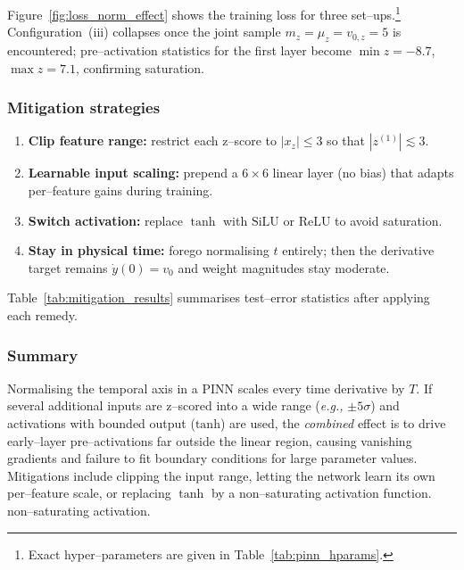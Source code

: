 Figure~\ref{fig:loss_norm_effect} shows the training loss for three
set--ups.\footnote{%
Exact hyper–parameters are given in Table~\ref{tab:pinn_hparams}.}
Configuration~(iii) collapses once the joint sample
$m_z\!=\!\mu_z\!=\!v_{0,z}\!=\!5$ is encountered; pre--activation statistics
for the first layer become
$\min z=-8.7$, $\max z=7.1$,
confirming saturation.

\subsubsection{Mitigation strategies}

\begin{enumerate}[label=(\roman*)]
  \item \textbf{Clip feature range:} restrict each z--score to
        $\lvert x_z\rvert\le 3$ so that $|z^{(1)}|\lesssim3$.
  \item \textbf{Learnable input scaling:} prepend a $6\times6$
        linear layer (no bias) that adapts per--feature gains during
        training.
  \item \textbf{Switch activation:} replace $\tanh$ with
        $\mathrm{SiLU}$ or $\mathrm{ReLU}$ to avoid saturation.
  \item \textbf{Stay in physical time:} forego normalising $t$
        entirely; then the derivative target remains $\dot y(0)=v_0$
        and weight magnitudes stay moderate.
\end{enumerate}

Table~\ref{tab:mitigation_results} summarises test--error statistics after
applying each remedy.

\subsubsection{Summary}

Normalising the temporal axis in a PINN scales every time derivative by $T$.
If several additional inputs are z–scored into a wide range (\textit{e.g.,} $\pm5\sigma$)
and activations with bounded output ($\mathrm{tanh}$) are used, the \emph{combined} effect
is to drive early--layer pre--activations far outside the linear region,
causing vanishing gradients and failure to fit boundary conditions for large
parameter values.  Mitigations include clipping the input range, letting the
network learn its own per--feature scale, or replacing $\tanh$ by a non--saturating activation function.
non--saturating activation.


